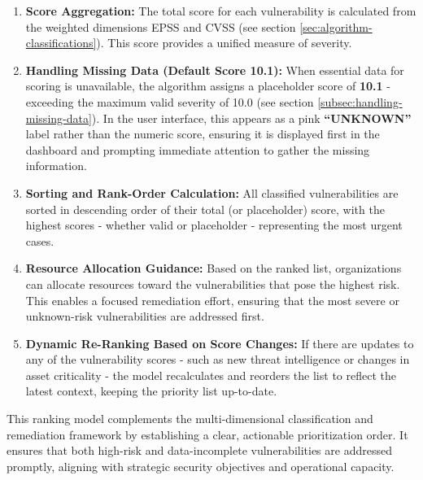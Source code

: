 \begin{enumerate}
    \item \textbf{Score Aggregation:} 
    The total score for each vulnerability is calculated from the weighted dimensions \ac{EPSS} and \ac{CVSS} (see section \ref{sec:algorithm-classifications}). This score provides a unified measure of severity.
    
    \item \textbf{Handling Missing Data (Default Score 10.1):} 
    When essential data for scoring is unavailable, the algorithm assigns a placeholder score of \textbf{10.1} - exceeding the maximum valid severity of 10.0 (see section \ref{subsec:handling-missing-data}). In the user interface, this appears as a pink \textbf{“UNKNOWN”} label rather than the numeric score, ensuring it is displayed first in the dashboard and prompting immediate attention to gather the missing information.
    
    \item \textbf{Sorting and Rank-Order Calculation:} 
    All classified vulnerabilities are sorted in descending order of their total (or placeholder) score, with the highest scores - whether valid or placeholder - representing the most urgent cases.
    
    \item \textbf{Resource Allocation Guidance:} 
    Based on the ranked list, organizations can allocate resources toward the vulnerabilities that pose the highest risk. This enables a focused remediation effort, ensuring that the most severe or unknown-risk vulnerabilities are addressed first.
    
    \item \textbf{Dynamic Re-Ranking Based on Score Changes:} 
    If there are updates to any of the vulnerability scores - such as new threat intelligence or changes in asset criticality - the model recalculates and reorders the list to reflect the latest context, keeping the priority list up-to-date.
\end{enumerate}

This ranking model complements the multi-dimensional classification and remediation framework by establishing a clear, actionable prioritization order. It ensures that both high-risk and data-incomplete vulnerabilities are addressed promptly, aligning with strategic security objectives and operational capacity.